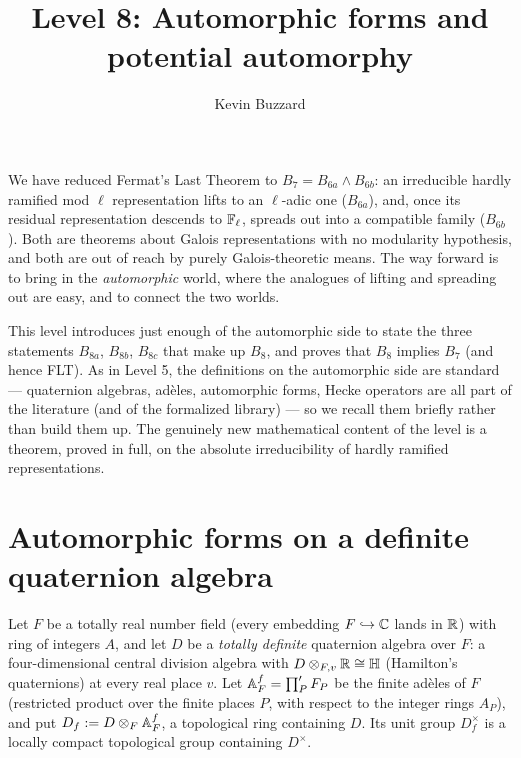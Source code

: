 \documentclass[11pt]{article}
\title{Level 8: Automorphic forms and potential automorphy}
\author{Kevin Buzzard}
\date{}
\begin{document}
\maketitle

\noindent
We have reduced Fermat's Last Theorem to $B_7=B_{6a}\wedge B_{6b}$: an
irreducible hardly ramified mod $\ell$ representation lifts to an $\ell$-adic
one ($B_{6a}$), and, once its residual representation descends to $\mathbb{F}_\ell$,
spreads out into a compatible family ($B_{6b}$). Both are theorems about Galois
representations with no modularity hypothesis, and both are out of reach by
purely Galois-theoretic means. The way forward is to bring in the
\emph{automorphic} world, where the analogues of lifting and spreading out are
easy, and to connect the two worlds.

\medskip\noindent
This level introduces just enough of the automorphic side to state the three
statements $B_{8a}$, $B_{8b}$, $B_{8c}$ that make up $B_8$, and proves that
$B_8$ implies $B_7$ (and hence FLT). As in Level 5, the definitions on the
automorphic side are standard --- quaternion algebras, ad\`eles, automorphic
forms, Hecke operators are all part of the literature (and of the formalized
library) --- so we recall them briefly rather than build them up. The genuinely
new mathematical content of the level is a theorem, proved in full, on the
absolute irreducibility of hardly ramified representations.

\section{Automorphic forms on a definite quaternion algebra}

Let $F$ be a totally real number field (every embedding $F\hookrightarrow\mathbb{C}$
lands in $\mathbb{R}$) with ring of integers $A$, and let $D$ be a \emph{totally
definite} quaternion algebra over $F$: a four-dimensional central division
algebra with $D\otimes_{F,v}\mathbb{R}\cong\mathbb{H}$ (Hamilton's quaternions) at every real
place $v$. Let $\mathbb{A}_{F}^{f}=\prod'_P F_P$ be the finite ad\`eles of $F$
(restricted product over the finite places $P$, with respect to the integer
rings $A_P$), and put $D_f:=D\otimes_F\mathbb{A}_{F}^{f}$, a topological ring containing
$D$. Its unit group $D_f^\times$ is a locally compact topological group
containing $D^\times$.
\end{document}
